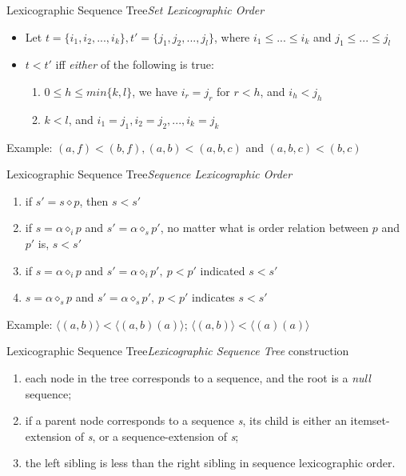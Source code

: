 \documentclass[12pt]{beamer}
\begin{document}
\begin{frame}{Lexicographic Sequence Tree}{{\it Set Lexicographic Order}}
\begin{itemize}
\item Let $t = \{ i_1,i_2,...,i_k\}, t'=\{j_1,j_2,...,j_l\}$, where $i_1 \leq ... \leq i_k$ and $j_1 \leq ... \leq j_l$
\item $t < t'$ iff {\it either} of the following is true:
\begin{enumerate}
\item $0 \leq h \leq min\{k,l\}$, we have $i_r = j_r$ for $r < h$, and $i_h < j_h$
\item $k < l$, and $i_1 = j_1,i_2 = j_2,...,i_k=j_k$
\end{enumerate}
\end{itemize}
Example: $(a,f) < (b,f), (a,b) < (a,b,c)$ and $(a,b,c) < (b,c)$
\end{frame}

\begin{frame}{Lexicographic Sequence Tree}{{\it Sequence Lexicographic Order}}
\begin{enumerate}[i]
\item if $s' = s \diamond p$, then $s < s'$
\item if $s = \alpha \diamond_i p$ and $s' = \alpha \diamond_s p'$, no matter what is order relation between $p$ and $p'$ is, $s < s'$
\item if $ s = \alpha \diamond_i p$ and $s' = \alpha \diamond_i p',~p < p'$ indicated $s < s'$
\item $s = \alpha \diamond_s p$ and $s' = \alpha \diamond_s p',~p < p'$ indicates $s < s'$
\end{enumerate}
Example: $\langle (a,b) \rangle < \langle (a,b)(a) \rangle$; $\langle (a,b) \rangle < \langle (a)(a) \rangle$
\end{frame}

\begin{frame}{Lexicographic Sequence Tree}{{\it Lexicographic Sequence Tree} construction}
\begin{enumerate}
\item each node in the tree corresponds to a sequence, and the root is a {\it null} sequence;
\item if a parent node corresponds to a sequence {\it s}, its child is either an itemset-extension of {\it s}, or a sequence-extension of {\it s};
\item the left sibling is less than the right sibling in sequence lexicographic order.
\end{enumerate}
\end{frame}
\end{document}
